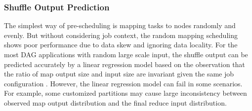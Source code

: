\subsubsection{Shuffle Output Prediction}\label{shuffleprediction}
{\color{blue}
The simplest way of pre-scheduling is mapping tasks to nodes randomly and evenly.
But without considering job context, the random mapping scheduling shows poor performance due to data skew and ignoring data locality.
For the most DAG applications with random large scale input, 
the shuffle output can be predicted accurately by a linear regression model based on the observation that the ratio of map output size and input size are invariant given the same job configuration \cite{guo2017ishuffle}.
However, the linear regression model can fail in some scenarios. 
For example, some customized partitions may cause large inconsistency between observed map output distribution and the final reduce input distribution. 
}
